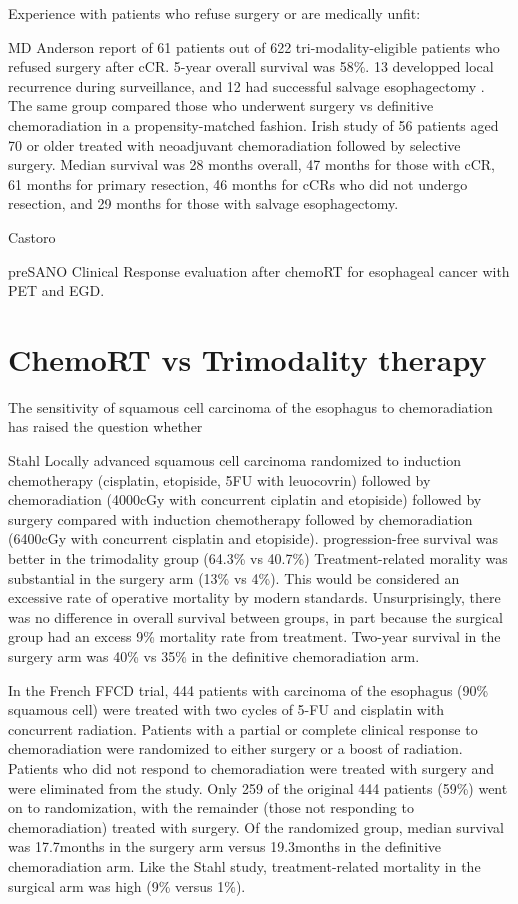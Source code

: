 \documentclass[
]{book}
\begin{document}
Experience with patients who refuse surgery or are medically unfit:

MD Anderson report of 61 patients out of 622 tri-modality-eligible patients who refused surgery after cCR. 5-year overall survival was 58\%. 13 developped local recurrence during surveillance, and 12 had successful salvage esophagectomy \citep{taketa300}. The same group compared those who underwent surgery vs definitive chemoradiation in a propensity-matched fashion\citep{taketa95}. Irish study of 56 patients aged 70 or older treated with neoadjuvant chemoradiation followed by selective surgery. Median survival was 28 months overall, 47 months for those with cCR, 61 months for primary resection, 46 months for cCRs who did not undergo resection, and 29 months for those with salvage esophagectomy\citep{furlong107}.

Castoro\citep{castoro1375}

preSANO\citep{chirieac1347} Clinical Response evaluation after chemoRT for esophageal cancer with PET and EGD.

\hypertarget{chemort-vs-trimodality-therapy}{%
\section{ChemoRT vs Trimodality therapy}\label{chemort-vs-trimodality-therapy}}

The sensitivity of squamous cell carcinoma of the esophagus to chemoradiation has raised the question whether

Stahl Locally advanced squamous cell carcinoma randomized to induction chemotherapy (cisplatin, etopiside, 5FU with leuocovrin) followed by chemoradiation (4000cGy with concurrent ciplatin and etopiside) followed by surgery compared with induction chemotherapy followed by chemoradiation (6400cGy with concurrent cisplatin and etopiside).\citep{stahl2310} progression-free survival was better in the trimodality group (64.3\% vs 40.7\%) Treatment-related morality was substantial in the surgery arm (13\% vs 4\%). This would be considered an excessive rate of operative mortality by modern standards. Unsurprisingly, there was no difference in overall survival between groups, in part because the surgical group had an excess 9\% mortality rate from treatment. Two-year survival in the surgery arm was 40\% vs 35\% in the definitive chemoradiation arm.

In the French FFCD trial, 444 patients with carcinoma of the esophagus (90\% squamous cell) were treated with two cycles of 5-FU and cisplatin with concurrent radiation.\citep{bedenne1160} Patients with a partial or complete clinical response to chemoradiation were randomized to either surgery or a boost of radiation. Patients who did not respond to chemoradiation were treated with surgery and were eliminated from the study. Only 259 of the original 444 patients (59\%) went on to randomization, with the remainder (those not responding to chemoradiation) treated with surgery. Of the randomized group, median survival was 17.7months in the surgery arm versus 19.3months in the definitive chemoradiation arm. Like the Stahl study, treatment-related mortality in the surgical arm was high (9\% versus 1\%).
\end{document}

